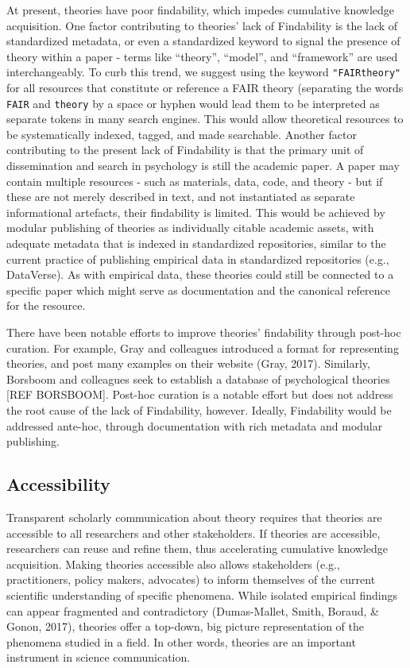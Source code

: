 \documentclass[
  man,floatsintext]{apa6}
\begin{document}
At present, theories have poor findability, which impedes cumulative knowledge acquisition.
One factor contributing to theories' lack of Findability is the lack of standardized metadata, or even a standardized keyword to signal the presence of theory within a paper - terms like ``theory'', ``model'', and ``framework'' are used interchangeably.
To curb this trend, we suggest using the keyword \texttt{"FAIRtheory"} for all resources that constitute or reference a FAIR theory (separating the words \texttt{FAIR} and \texttt{theory} by a space or hyphen would lead them to be interpreted as separate tokens in many search engines.
This would allow theoretical resources to be systematically indexed, tagged, and made searchable.
Another factor contributing to the present lack of Findability is that the primary unit of dissemination and search in psychology is still the academic paper.
A paper may contain multiple resources - such as materials, data, code, and theory - but if these are not merely described in text, and not instantiated as separate informational artefacts, their findability is limited.
This would be achieved by modular publishing of theories as individually citable academic assets, with adequate metadata that is indexed in standardized repositories,
similar to the current practice of publishing empirical data in standardized repositories (e.g., DataVerse).
As with empirical data, these theories could still be connected to a specific paper which might serve as documentation and the canonical reference for the resource.

There have been notable efforts to improve theories' findability through post-hoc curation.
For example, Gray and colleagues introduced a format for representing theories,
and post many examples on their website (Gray, 2017).
Similarly, Borsboom and colleagues seek to establish a database of psychological theories {[}REF BORSBOOM{]}.
Post-hoc curation is a notable effort but does not address the root cause of the lack of Findability, however.
Ideally, Findability would be addressed ante-hoc, through documentation with rich metadata and modular publishing.

\subsection{Accessibility}\label{accessibility}

Transparent scholarly communication about theory requires that theories are accessible to all researchers and other stakeholders.
If theories are accessible, researchers can reuse and refine them,
thus accelerating cumulative knowledge acquisition.
Making theories accessible also allows stakeholders (e.g., practitioners, policy makers, advocates) to inform themselves of the current scientific understanding of specific phenomena.
While isolated empirical findings can appear fragmented and contradictory (Dumas-Mallet, Smith, Boraud, \& Gonon, 2017),
theories offer a top-down, big picture representation of the phenomena studied in a field.
In other words, theories are an important instrument in science communication.
\end{document}
